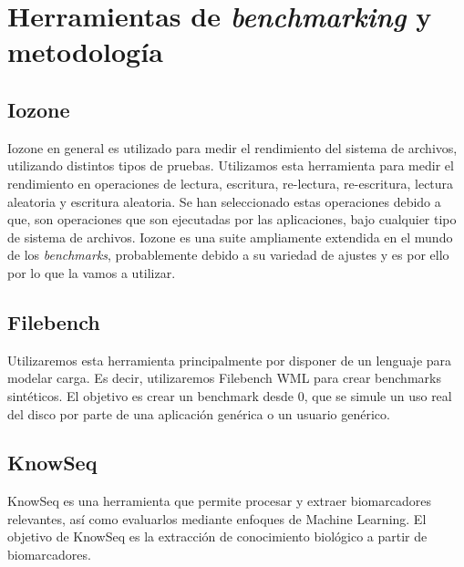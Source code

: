 \section{Herramientas de \textit{benchmarking} y metodología}
\subsection{Iozone}
Iozone en general es utilizado para medir el rendimiento del sistema de archivos, utilizando distintos tipos de pruebas. Utilizamos esta herramienta para medir el rendimiento en operaciones de lectura, escritura, re-lectura, re-escritura, lectura aleatoria y escritura aleatoria. Se han seleccionado estas operaciones debido a que, son operaciones que son ejecutadas por las aplicaciones, bajo cualquier tipo de sistema de archivos. Iozone es una suite ampliamente extendida en el mundo de los \textit{benchmarks}, probablemente debido a su variedad de ajustes y es por ello por lo que la vamos a utilizar.

\subsection{Filebench}
Utilizaremos esta herramienta principalmente por disponer de un lenguaje para modelar carga. Es decir, utilizaremos Filebench WML para crear benchmarks sintéticos. El objetivo es crear un benchmark desde 0, que se simule un uso real del disco por parte de una aplicación genérica o un usuario genérico. 

\subsection{KnowSeq}\label{metodologia_knowseq}
KnowSeq es una herramienta que permite procesar y extraer biomarcadores relevantes, así como evaluarlos mediante enfoques de Machine Learning. El objetivo de KnowSeq es la extracción de conocimiento biológico a partir de biomarcadores. \\

